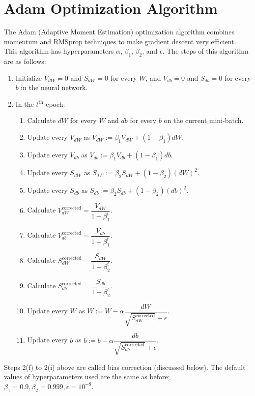 \documentclass[a4paper, 12pt]{report}
\begin{document}
\section{Adam Optimization Algorithm}
The Adam (Adaptive Moment Estimation) optimization algorithm combines momentum and RMSprop techniques to make gradient descent very efficient. This algorithm has hyperparameters $\alpha$, $\beta_1$, $\beta_2$, and $\epsilon$. The steps of this algorithm are as follows:
\begin{enumerate}
\item Initialize $V_{dW}=0$ and $S_{dW}=0$ for every $W$, and $V_{db}=0$ and $S_{db}=0$ for every $b$ in the neural network.
\item In the $t^{\text{th}}$ epoch:
\begin{enumerate}
\item Calculate $dW$ for every $W$ and $db$ for every $b$ on the current mini-batch.
\item Update every $V_{dW}$ as $V_{dW} := \beta_1 V_{dW} + (1-\beta_1) dW$.
\item Update every $V_{db}$ as $V_{db} := \beta_1 V_{db} + (1-\beta_1) db$.
\item Update every $S_{dW}$ as $S_{dW} := \beta_2 S_{dW} + (1-\beta_2) (dW)^2$.
\item Update every $S_{db}$ as $S_{db} := \beta_2 S_{db} + (1-\beta_2) (db)^2$.
\item Calculate $V_{dW}^{\text{corrected}} = \dfrac{V_{dW}}{1-\beta_1^t}$.
\item Calculate $V_{db}^{\text{corrected}} = \dfrac{V_{db}}{1-\beta_1^t}$.
\item Calculate $S_{dW}^{\text{corrected}} = \dfrac{S_{dW}}{1-\beta_2^t}$.
\item Calculate $S_{db}^{\text{corrected}} = \dfrac{S_{db}}{1-\beta_2^t}$.
\item Update every $W$ as $W := W - \alpha \dfrac{dW}{\sqrt{S_{dW}^{\text{corrected}}}+\epsilon}$.
\item Update every $b$ as $b := b - \alpha \dfrac{db}{\sqrt{S_{db}^{\text{corrected}}}+\epsilon}$.
\end{enumerate}
\end{enumerate}
Steps 2(f) to 2(i) above are called bias correction (discussed below). The default values of hyperparameters used are the same as before; $\beta_1=0.9, \beta_2=0.999, \epsilon=10^{-8}$.
\end{document}
